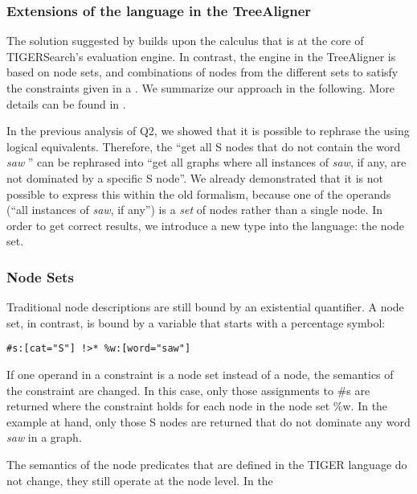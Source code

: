 \documentclass[output=paper]{LSP/langsci}
\begin{document}
\subsubsection{Extensions of the  language in the TreeAligner}\label{sec:volk:3.2.2}

The solution suggested by \citet{Lezius2002b} builds upon the  calculus that is at the core of TIGERSearch's  evaluation engine. In contrast, the  engine in the TreeAligner is based on node sets, and combinations of nodes from the different sets to satisfy the constraints given in a . We summarize our approach in the following. More details can be found in \citet{MarekEtAl2008}. 

In the previous analysis of Q2, we showed that it is possible to rephrase the  using logical equivalents. Therefore, the  ``get all S nodes that do not contain the word \textit{saw} '' can be rephrased into ``get all graphs where all instances of \textit{saw}, if any, are not dominated by a specific S node''. We already demonstrated that it is not possible to express this  within the old formalism, because one of the operands (``all instances of \textit{saw}, if any'') is a \textit{set} of nodes rather than a single node. In order to get correct results, we introduce a new type into the  language: the node set. 

\subsubsection{Node Sets}\label{sec:volk:3.2.3}

Traditional node descriptions are still bound by an existential quantifier. A node set, in contrast, is bound by a variable that starts with a percentage symbol:

\ea
\begin{lstlisting}
#s:[cat="S"] !>* %w:[word="saw"] 
\end{lstlisting}
\z

If one operand in a constraint is a node set instead of a node, the semantics of the constraint are changed. In this case, only those assignments to \#s are returned where the constraint holds for each node in the node set \%w. In the example at hand, only those S nodes are returned that do not dominate any word \textit{saw} in a graph. 

The semantics of the node predicates that are defined in the TIGER  language do not change, they still operate at the node level. In the 
\end{document}
